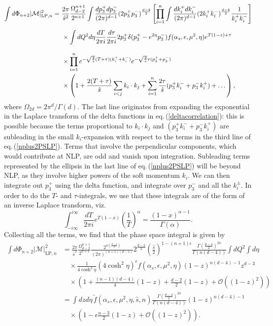 \documentclass[11pt]{article}
\newcommand{\M}{\mathcal{M}}
\newcommand{\s}{\hat{s}}
\newcommand\eqn[1]     {eq.\,(\ref{#1})}
\begin{document}
\begin{align}\label{nplus2PSLP}
\int d\Phi_{n+2}|\M|^2_{\text{LP},n} &
= \frac{2\pi}{\s^2}\frac{\Omega_{d-2}^{n+1}}{2^{n+1}}\int\frac{dp_3^+dp_3^-}{(2\pi)^{d-1}}
(2p_3^+p_3^-)^\frac{d-4}{2}\left[\prod_{i=1}^n\int\frac{dk_i^+dk_i^-}{(2\pi)^{d-1}}
(2k_i^+k_i^-)^{\frac{d-4}{2}}
\frac{1}{k_i^+k_i^-}\right]\nonumber \\[0.2cm]
&\hspace{0.5cm}\times\int dQ^2 d\eta\frac{dT}{2\pi i}
\frac{d\tau}{2\pi i} 2p_3^+\delta(p_3^+-e^{2\eta}p_3^-)
f(\alpha_s,\epsilon,\mu^2,\eta)e^{T(1-z)+\tau} \nonumber \\[0.3cm]
&\hspace{0.5cm}\times 
\prod_{i=1}^ne^{-\sqrt{\frac{2}{\s}}(T+\tau)(k_i^++k_i^-)} e^{-\sqrt{\frac{2}{\s}}\tau(p_3^++p_3^-)}\nonumber \\
&\hspace{0.5cm}\times\left(1+\frac{2(T+\tau)}{\s}
\sum_{i<j}k_i\cdot k_j+\sum_{i=1}^n\frac{2\tau}{\s}(p_3^+k_i^-+p_3^-k_i^+)+\dots\right),
\end{align}
where $\Omega_{2d}=2\pi^{d}/\Gamma(d)$. The last line originates from expanding the exponential in the Laplace transform of the delta functions in \eqn{deltacorrelation}: this is possible because the terms proportional to $k_i\cdot k_j$ 
and $(p_3^+k_i^-+p_3^-k_i^+)$ are subleading in the small $k_i$-expansion with respect to the terms in the third line of \eqn{nplus2PSLP}. Terms that involve the perpendicular components, which would contribute at NLP, are odd and vanish upon integration. Subleading terms represented by the ellipsis in the last line of \eqn{nplus2PSLP} will be beyond NLP, as they involve higher powers of the soft momentum $k_i$. 
We can then integrate out $p_3^+$ using the delta function, and integrate over $p_3^-$ and all the $k_i^\pm$. In order to do the $T$- and $\tau$-integrals, we use that these integrals are of the form of an inverse Laplace transform, viz.\
\begin{equation}\label{inverselaplace}
    \int_{-i\infty}^{i\infty}\frac{dT}{2\pi i}e^{T(1-x)}\left(\frac{1}{T}\right)^{\alpha} = \frac{(1-x)^{\alpha-1}}{\Gamma(\alpha)}. 
\end{equation}
Collecting all the terms, we find that the phase space integral is given by
\begin{align}
    \int d\Phi_{n+2}|\M|^2_{\text{LP}, n} &= \frac{2\pi}{\s^2}\frac{\Omega_{d-2}^{n+1}}{2^{n+1}}\frac{2^{n(\frac{d-4}{2})}}{(2\pi)^{(n+1)(d-1)}}2^{\frac{d-2}{2}}\left(\frac{\s}{2}\right)^{1-(n+1)\epsilon}\frac{\Gamma\left(\frac{d-4}{2}\right)^{2n}}{\Gamma(n(d-4))}\int dQ^2\int d\eta \nonumber \\
    &\quad\times \frac{1}{4\cosh^2\eta}(4\cosh^2\eta)^\epsilon f(\alpha_s,\epsilon,\mu^2,\eta)(1-z)^{n(d-4)-1}z^{d-3}\nonumber \\
    &\quad\times \left(1+\frac{(n-1)(d-4)}{4}(1-z)+\frac{d-2}{2}(1-z)+\mathcal{O}\left((1-z)^2\right)\right)\nonumber \\
    &=\int dzd\eta\,\tilde{f}(\alpha_s,\epsilon,\mu^2,\eta,\s,n)\frac{\Gamma(\frac{d-4}{2})^{2n}}{\Gamma(n(d-4))}(1-z)^{n(d-4)-1}\nonumber \\
    &\quad\times \left(1-\epsilon\frac{n-3}{2}(1-z)+\mathcal{O}\left((1-z)^2\right)\right).
\end{align}
\end{document}
